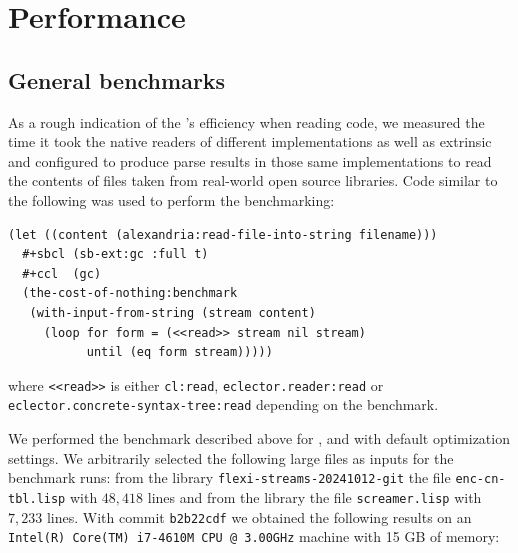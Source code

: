 \section{Performance}
\label{sec-performance}

\subsection{General benchmarks}
\label{sec:benchmarks}

As a rough indication of the \eclector{}'s efficiency when reading
\cl{} code, we measured the time it took the native readers of
different \cl{} implementations as well as extrinsic \eclector{} and
\eclector{} configured to produce parse results in those same
implementations to read the contents of \cl{} files taken from
real-world open source libraries.  Code similar to the following was
used to perform the benchmarking:%
%
\begin{listing}[H]
\begin{verbatim}
(let ((content (alexandria:read-file-into-string filename)))
  #+sbcl (sb-ext:gc :full t)
  #+ccl  (gc)
  (the-cost-of-nothing:benchmark
   (with-input-from-string (stream content)
     (loop for form = (<<read>> stream nil stream)
           until (eq form stream)))))
\end{verbatim}
\end{listing}
%
\vspace{-2em} \noindent where \texttt{<<read>>} is either
\texttt{cl:read},
\texttt{eclector.reader:read} or\\
\texttt{eclector.concrete-syntax-tree:read} depending on the
benchmark.

We performed the benchmark described above for \sbcl{}, \ccl{} and
\ecl{} with default optimization settings.  We arbitrarily selected
the following large \cl{} files as inputs for the benchmark runs: from
the library \texttt{flexi-streams-20241012-git} the file
\texttt{enc-cn-tbl.lisp} with $48,418$ lines and from the library
 the file \texttt{screamer.lisp} with
$7,233$ lines.  With \eclector{} commit \texttt{b2b22cdf} we obtained
the following results on an \texttt{Intel(R) Core(TM) i7-4610M CPU @
  3.00GHz} machine with 15 GB of memory:

